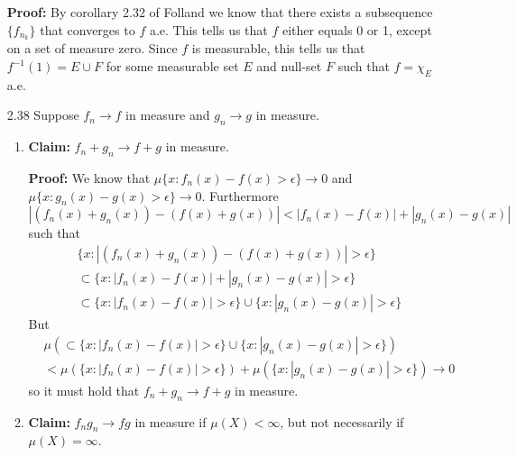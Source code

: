 \documentclass[11pt,letter]{article}
\begin{document}
\begin{enumerate}
    \textbf{Proof:} By corollary 2.32 of Folland we know that there exists a subsequence $\{f_{n_k}\}$ that converges to $f$ a.e. This tells us that $f$ either equals 0 or 1, except on a set of measure zero. Since $f$ is measurable, this tells us that $f^{-1}(1) = E \cup F$ for some measurable set $E$ and null-set $F$ such that $f = \chi_E$ a.e.
    
    \item [2.38] Suppose $f_n \rightarrow f$ in measure and $g_n \rightarrow g$ in measure.
    \begin{enumerate}
        \item \textbf{Claim:} $f_n + g_n \rightarrow f + g$ in measure.
        
        \textbf{Proof:} We know that $\mu\{x: f_n(x) - f(x) > \epsilon\} \rightarrow 0$ and $\mu\{x: g_n(x) - g(x) > \epsilon\} \rightarrow 0$. Furthermore $|(f_n(x) + g_n(x)) - (f(x) + g(x))| < |f_n(x) - f(x)| + |g_n(x) - g(x)|$ such that
        \begin{align*}
            & \{x: |(f_n(x) + g_n(x)) - (f(x) + g(x))| > \epsilon\} \\
             & \subset \{x: |f_n(x) - f(x)| + |g_n(x) - g(x)| > \epsilon\} \\ 
             & \subset \{x: |f_n(x) - f(x)| > \epsilon\} \cup \{x: |g_n(x) - g(x)| > \epsilon\}
        \end{align*}
        But 
        \begin{align*}
            & \mu(\subset \{x: |f_n(x) - f(x)| > \epsilon\} \cup \{x: |g_n(x) - g(x)| > \epsilon\}) \\
            & < \mu(\{x: |f_n(x) - f(x)| > \epsilon\}) + \mu(\{x: |g_n(x) - g(x)| > \epsilon\}) \rightarrow 0
        \end{align*}
        so it must hold that $f_n + g_n \rightarrow f + g$ in measure.
        \item \textbf{Claim:} $f_ng_n \rightarrow fg$ in measure if $\mu(X) < \infty$, but not necessarily if $\mu(X) = \infty$.
        

\end{enumerate}
\end{enumerate}
\end{document}
